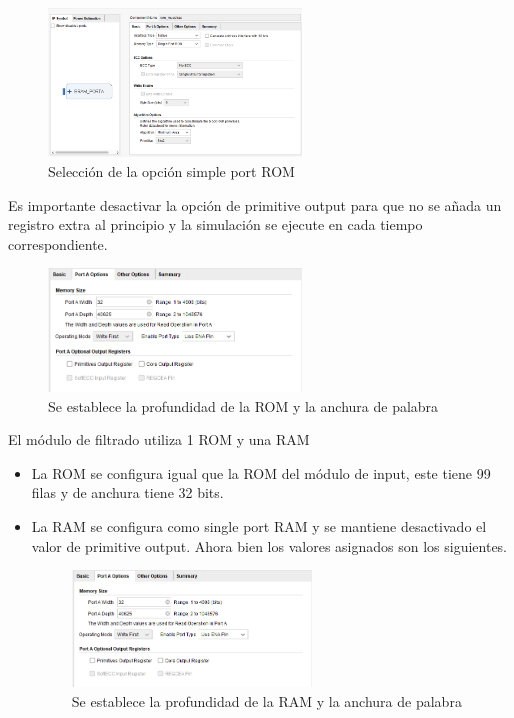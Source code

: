 \begin{figure}[h!]
    \centering
    \includegraphics[width=0.6\textwidth]{./Images/img_implementacion_hw/rom_muestras_1.png}
    \caption{Selección de la opción simple port ROM}
    \label{fig:rom_muestras_1}
\end{figure}
 Es importante desactivar la opción de primitive output para que no se añada un registro extra 
 al principio y la simulación se ejecute en cada tiempo correspondiente. 
\begin{figure}[h!]
    \centering
    \includegraphics[width=0.6\textwidth]{./Images/img_implementacion_hw/rom_muestras_2.png}
    \caption{Se establece la profundidad de la ROM y la anchura de palabra}
    \label{fig:rom_muestras_2}
\end{figure}

El módulo de filtrado utiliza 1 ROM y una RAM

\begin{itemize}
\item La ROM se configura igual que la ROM del módulo de input, este tiene 99 filas y de anchura 
tiene 32 bits.
\item La RAM se configura como single port RAM y se mantiene desactivado el valor de primitive output.
 Ahora bien los valores asignados son los siguientes.
 
\begin{figure}[h!]
    \centering
    \includegraphics[width=0.6\textwidth]{./Images/img_implementacion_hw/rom_muestras_2.png}
    \caption{Se establece la profundidad de la RAM y la anchura de palabra}
    \label{fig:ram_muestras_1}
\end{figure}

\end{itemize}

